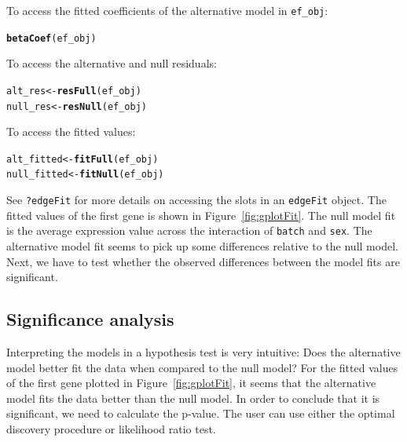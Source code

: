 \documentclass{article}\usepackage[]{graphicx}\usepackage[]{color}
\makeatletter
\newcommand{\hlstd}[1]{\textcolor[rgb]{0.345,0.345,0.345}{#1}}%
\newcommand{\hlkwb}[1]{\textcolor[rgb]{0.69,0.353,0.396}{#1}}%
\newcommand{\hlkwd}[1]{\textcolor[rgb]{0.737,0.353,0.396}{\textbf{#1}}}%
\newenvironment{kframe}{%
 \def\at@end@of@kframe{}%
 \ifinner\ifhmode%
  \def\at@end@of@kframe{\end{minipage}}%
  \begin{minipage}{\columnwidth}%
 \fi\fi%
 \def\FrameCommand##1{\hskip\@totalleftmargin \hskip-\fboxsep
 \colorbox{shadecolor}{##1}\hskip-\fboxsep
     \hskip-\linewidth \hskip-\@totalleftmargin \hskip\columnwidth}%
 \MakeFramed {\advance\hsize-\width
   \@totalleftmargin\z@ \linewidth\hsize
   \@setminipage}}%
 {\par\unskip\endMakeFramed%
 \at@end@of@kframe}
\newenvironment{knitrout}{}{} %
\makeatother
\begin{document}
To access the fitted coefficients of the alternative model in {\tt ef\_obj}:
\begin{knitrout}
\color{fgcolor}\begin{kframe}
\begin{alltt}
\hlkwd{betaCoef}\hlstd{(ef_obj)}
\end{alltt}
\end{kframe}
\end{knitrout}
To access the alternative and null residuals:
\begin{knitrout}
\color{fgcolor}\begin{kframe}
\begin{alltt}
\hlstd{alt_res} \hlkwb{<-} \hlkwd{resFull}\hlstd{(ef_obj)}
\hlstd{null_res} \hlkwb{<-} \hlkwd{resNull}\hlstd{(ef_obj)}
\end{alltt}
\end{kframe}
\end{knitrout}
To access the fitted values:
\begin{knitrout}
\color{fgcolor}\begin{kframe}
\begin{alltt}
\hlstd{alt_fitted} \hlkwb{<-} \hlkwd{fitFull}\hlstd{(ef_obj)}
\hlstd{null_fitted} \hlkwb{<-} \hlkwd{fitNull}\hlstd{(ef_obj)}
\end{alltt}
\end{kframe}
\end{knitrout}

See {\tt ?edgeFit} for more details on accessing the slots in an {\tt edgeFit} object. The fitted values of the first gene is shown in Figure~\ref{fig:gplotFit}. The null model fit is the average expression value across the interaction of {\tt batch} and {\tt sex}. The alternative model fit seems to pick up some differences relative to the null model. Next, we have to test whether the observed differences between the model fits are significant.

\subsection{Significance analysis}
Interpreting the models in a hypothesis test is very intuitive: Does the alternative model better fit the data when compared to the null model? For the fitted values of the first gene plotted in Figure~\ref{fig:gplotFit}, it seems that the alternative model fits the data better than the null model. In order to conclude that it is significant, we need to calculate the p-value. The user can use either the optimal discovery procedure or likelihood ratio test. 
\end{document}
